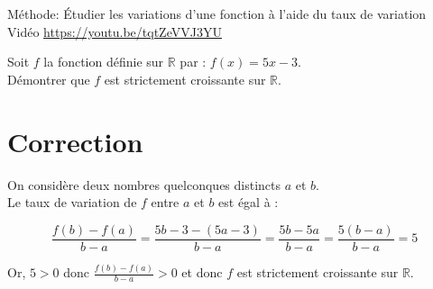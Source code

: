 \documentclass[10pt]{article}
\begin{document}
Méthode: Étudier les variations d'une fonction à l'aide du taux de variation\\
Vidéo \href{https://youtu.be/tqtZeVVJ3YU}{https://youtu.be/tqtZeVVJ3YU}

Soit \(f\) la fonction définie sur \(\mathbb{R}\) par : \(f(x)=5 x-3\).\\
Démontrer que \(f\) est strictement croissante sur \(\mathbb{R}\).

\section*{Correction}
On considère deux nombres quelconques distincts \(a\) et \(b\).\\
Le taux de variation de \(f\) entre \(a\) et \(b\) est égal à :

\[
\frac{f(b)-f(a)}{b-a}=\frac{5 b-3-(5 a-3)}{b-a}=\frac{5 b-5 a}{b-a}=\frac{5(b-a)}{b-a}=5
\]

Or, \(5>0\) donc \(\frac{f(b)-f(a)}{b-a}>0\) et donc \(f\) est strictement croissante sur \(\mathbb{R}\).
\end{document}
